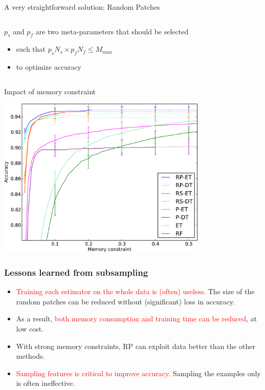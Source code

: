 \documentclass{beamer}
\begin{document}
\begin{frame}{A very straightforward solution: Random Patches}
\begin{columns}[t]
\begin{column}{0.6\textwidth}
\bigskip

{\small
$p_s$ and $p_f$ are two meta-parameters that should be selected
\begin{itemize}
\item such that $p_sN_s\times p_fN_f\leq M_{max}$
\item to optimize accuracy
\end{itemize}
}

\end{column}
\end{columns}

\end{frame}

\begin{frame}{Impact of memory constraint}

\begin{center}
\includegraphics[width=10cm]{figures/rp-memory.pdf}
\end{center}

\end{frame}

\begin{frame}
\frametitle{Lessons learned from subsampling}

\begin{itemize}

\item \textcolor{red}{Training each estimator on the whole data is (often)
useless}. The size of the random patches can be reduced without (significant)
loss in accuracy.

\item As a result, \textcolor{red}{both memory consumption and training time
can be reduced}, at low cost.

\item With strong memory constraints, RP can exploit data better than the
other methods.

\item \textcolor{red}{Sampling features is critical to improve accuracy.}
Sampling the examples only is often ineffective.
\end{itemize}

\end{frame}
\end{document}
